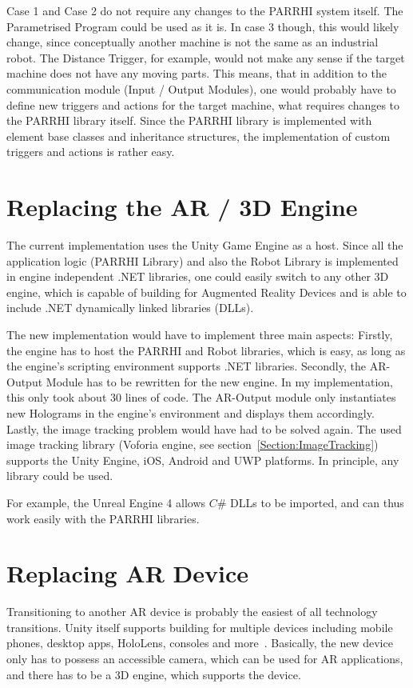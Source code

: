 Case 1 and Case 2 do not require any changes to the PARRHI system itself. The Parametrised Program could be used as it is. In case 3 though, this would likely change, since conceptually another machine is not the same as an industrial robot. The Distance Trigger, for example, would not make any sense if the target machine does not have any moving parts. This means, that in addition to the communication module (Input / Output Modules), one would probably have to define new triggers and actions for the target machine, what requires changes to the PARRHI library itself. Since the PARRHI library is implemented with element base classes and inheritance structures, the implementation of custom triggers and actions is rather easy.

\section{Replacing the AR / 3D Engine}

The current implementation uses the Unity Game Engine as a host. Since all the application logic (PARRHI Library) and also the Robot Library is implemented in engine independent .NET libraries, one could easily switch to any other 3D engine, which is capable of building for Augmented Reality Devices and is able to include .NET dynamically linked libraries (DLLs). 

The new implementation would have to implement three main aspects: Firstly, the engine has to host the PARRHI and Robot libraries, which is easy, as long as the engine's scripting environment supports .NET libraries. Secondly, the AR-Output Module has to be rewritten for the new engine. In my implementation, this only took about 30 lines of code. The AR-Output module only instantiates new Holograms in the engine's environment and displays them accordingly. Lastly, the image tracking problem would have had to be solved again. The used image tracking library (Voforia engine, see section~\ref{Section:ImageTracking}) supports the Unity Engine, iOS, Android and UWP platforms. In principle, any library could be used.

For example, the Unreal Engine 4 \cite{unrealEngine} allows $C\#$ DLLs to be imported, and can thus work easily with the PARRHI libraries.

\section{Replacing AR Device}

Transitioning to another AR device is probably the easiest of all technology transitions. Unity itself supports building for multiple devices including mobile phones, desktop apps, HoloLens, consoles and more~\cite{UnityPlatforms}. Basically, the new device only has to possess an accessible camera, which can be used for AR applications, and there has to be a 3D engine, which supports the device. 